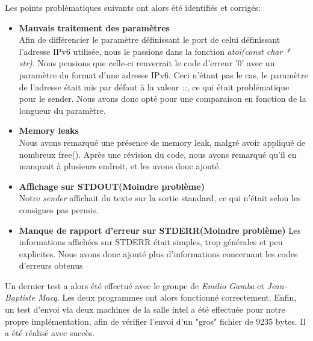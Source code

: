 \documentclass[11pt,a4paper]{article}
\begin{document}
Les points problématiques suivants ont alors été identifiés et corrigés:

\begin{itemize}
\item{\textbf{Mauvais traitement des paramètres} \\ Afin de différencier le paramètre définissant le port de celui définissant l'adresse IPv6 utilisée, nous le passions dans la fonction \textit{atoi(const char * str)}. Nous pensions que celle-ci renverrait le code d'erreur '0' avec un paramètre du format d'une adresse IPv6. Ceci n'étant pas le cas, le paramètre de l'adresse était mis par défaut à la valeur \textit{::}, ce qui était problématique pour le sender. Nous avons donc opté pour une comparaison en fonction de la longueur du paramètre.}
\item{\textbf{Memory leaks} \\ Nous avons remarqué une présence de memory leak, malgré avoir appliqué de nombreux free(). Après une révision du code, nous avons remarqué qu'il en manquait à plusieurs endroit, et les avons donc ajouté.}
\item{\textbf{Affichage sur STDOUT(Moindre problème)} \\Notre \textit{sender} affichait du texte sur la sortie standard, ce qui n'était selon les consignes pas permis.}
\item{\textbf{Manque de rapport d'erreur sur STDERR(Moindre problème)} Les informations affichées sur STDERR était simples, trop générales et peu explicites. Nous avons donc ajouté plus d'informations concernant les codes d'erreurs obtenus}
\end{itemize}
 
Un dernier test a alors été effectué avec le groupe de \textit{Emilio Gamba} et \textit{Jean-Baptiste Macq}. Les deux programmes ont alors fonctionné correctement. Enfin, un test d'envoi via deux machines de la salle intel a été effectuée pour notre propre implémentation, afin de vérifier l'envoi d'un "gros" fichier de 9235 bytes. Il a été réalisé avec succès.
\end{document}
